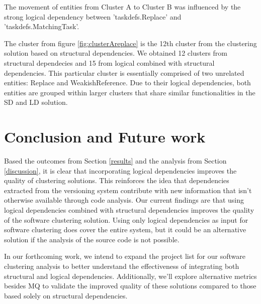 \documentclass[conference]{IEEEtran}
\begin{document}
The movement of entities from Cluster A to Cluster B was influenced by the strong logical dependency between 'taskdefs.Replace' and 'taskdefs.MatchingTask'.

The cluster from figure \ref{fig:clusterAreplace} is the 12th cluster from the clustering solution based on structural dependencies. We obtained 12 clusters from structural dependecies and 15 from logical combined with structural dependencies. This particular cluster is essentially comprised of two unrelated entities: Replace and WeakishReference. Due to their logical dependencies, both entities are grouped within larger clusters that share similar functionalities in the SD and LD solution.



\section{Conclusion and Future work}
\label{conclusion}

Based the outcomes from Section \ref{results} and the analysis from Section \ref{discussion}, it is clear that incorporating logical dependencies improves the quality of clustering solutions. 
This reinforces the idea that dependencies extracted from the versioning system contribute with new information that isn't otherwise available through code analysis. Our current findings are that using logical dependencies combined with structural dependencies improves the quality of the software clustering solution. Using only logical dependencies as input for software clustering does cover the entire system, but it could be an alternative solution if the analysis of the source code is not possible.

In our forthcoming work, we intend to expand the project list for our software clustering analysis to better understand the effectiveness of integrating both structural and logical dependencies. Additionally, we'll explore alternative metrics besides MQ to validate the improved quality of these solutions compared to those based solely on structural dependencies.



\end{document}
